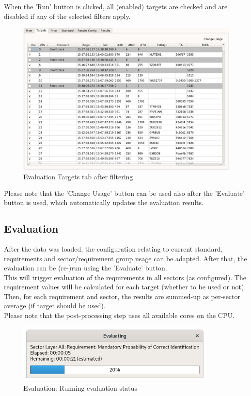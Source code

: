 When the 'Run' button is clicked, all (enabled) targets are checked and are disabled if any of the selected filters apply.

\begin{figure}[H]
  \hspace*{-2cm}
    \includegraphics[width=18cm,frame]{figures/eval_targets_filtered.png}
  \caption{Evaluation Targets tab after filtering}
\end{figure}

Please note that the 'Change Usage' button can be used also after the 'Evaluate' button is used, which automatically updates the evaluation results.

\subsection{Evaluation}
\label{sec:eval_run_eval} 

After the data was loaded, the configuration relating to current standard, requirements and sector/requirement group usage can be adapted. After that, the evaluation can be (re-)run using the 'Evaluate' button. \\

This will trigger evaluation of the requirements in all sectors (as configured). The requirement values will be calculated for each target (whether to be used or not). Then, for each requirement and sector, the results are summed-up as per-sector average (if target should be used). \\

Please note that the post-processing step uses all available cores on the CPU.

\begin{figure}[H]
  \centering 
    \includegraphics[width=10cm]{figures/eval_eval_status.png}
  \caption{Evaluation: Running evaluation status}
\end{figure}

